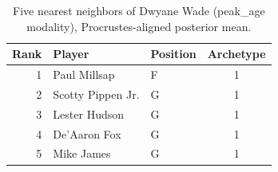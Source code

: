 \begin{table}[htbp]
  \centering\small
  \begin{tabular}{rllc}
    \toprule
    Rank & Player & Position & Archetype \\
    \midrule
    1 & Paul Millsap & F & 1 \\
    2 & Scotty Pippen Jr. & G & 1 \\
    3 & Lester Hudson & G & 1 \\
    4 & De'Aaron Fox & G & 1 \\
    5 & Mike James & G & 1 \\
    \bottomrule
  \end{tabular}
  \caption{Five nearest neighbors of Dwyane Wade (peak_age modality), Procrustes-aligned posterior mean.}
  \label{tab:Dwyane_Wade_neighbors_peak_age}
\end{table}

